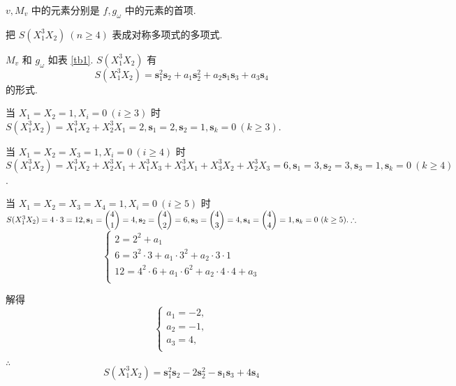 \documentclass[color=black,device=normal,lang=cn,mode=geye]{elegantnote}
\begin{document}




$v,M_v$ 中的元素分别是 $f,g_\omega$ 中的元素的首项.
\begin{example}
    把 $S(X_1^3X_2)\ (n\geq4)$ 表成对称多项式的多项式.
\end{example}
\begin{solution}
    $M_v$ 和 $g_\omega$ 如表 \ref{tb1}. $S(X_1^3X_2)$ 有
    \[S(X_1^3X_2)=\mathbf{s}_1^2\mathbf{s}_2+a_1\mathbf{s}_2^2+a_2\mathbf{s}_1\mathbf{s}_3+a_3\mathbf{s}_4\]
    的形式.

    当 $X_1=X_2=1,X_i=0\ (i\geq3)$ 时 $S(X_1^3X_2)=X_1^3X_2+X_2^3X_1=2,\mathbf{s}_1=2,\mathbf{s}_2=1,\mathbf{s}_k=0\ (k\geq3)$.

    当 $X_1=X_2=X_3=1,X_i=0\ (i\geq4)$ 时 $S(X_1^3X_2)=X_1^3X_2+X_2^3X_1+X_1^3X_3+X_3^3X_1+X_3^3X_2+X_2^3X_3=6,\mathbf{s}_1=3,\mathbf{s}_2=3,\mathbf{s}_3=1,\mathbf{s}_k=0\ (k\geq4)$.

    当 $X_1=X_2=X_3=X_4=1,X_i=0\ (i\geq5)$ 时 $S(X_1^3X_2)=4\cdot3=12,\mathbf{s}_1=\dbinom{4}{1}=4,\mathbf{s}_2=\dbinom{4}{2}=6,\mathbf{s}_3=\dbinom{4}{3}=4,\mathbf{s}_4=\dbinom{4}{4}=1,\mathbf{s}_k=0\ (k\geq5).\therefore$
    \[\begin{cases}
        2=2^2+a_1 \\
        6=3^2\cdot3+a_1\cdot3^2+a_2\cdot3\cdot1 \\
        12=4^2\cdot6+a_1\cdot6^2+a_2\cdot4\cdot4+a_3 \\
    \end{cases}\]

    解得
    \[\begin{cases}
        a_1=-2, \\
        a_2=-1, \\
        a_3=4, \\
    \end{cases}\]

    $\therefore$
    \[S(X_1^3X_2)=\mathbf{s}_1^2\mathbf{s}_2-2\mathbf{s}_2^2-\mathbf{s}_1\mathbf{s}_3+4\mathbf{s}_4\]
\end{solution}
\end{document}
